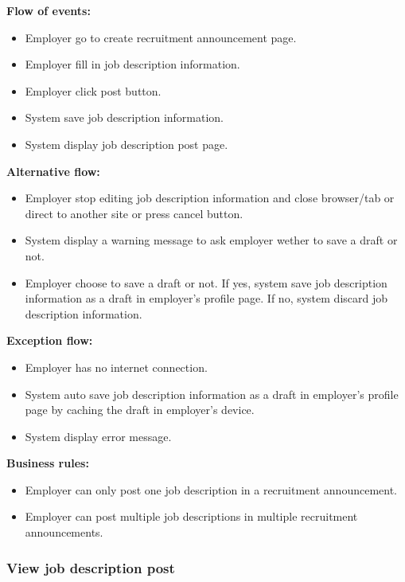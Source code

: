 \documentclass[a4paper]{article}
\begin{document}
        \textbf{Flow of events:}
        \begin{itemize}
            \item Employer go to create recruitment announcement page.
            \item Employer fill in job description information.
            \item Employer click post button.
            \item System save job description information.
            \item System display job description post page.
        \end{itemize}

        \textbf{Alternative flow:}
        \begin{itemize}
            \item Employer stop editing job description information and close browser/tab or direct to another site or press cancel button.
            \item System display a warning message to ask employer wether to save a draft or not.
            \item Employer choose to save a draft or not. If yes, system save job description information as a draft in employer's profile page. If no, system discard job description information.
        \end{itemize}

        \textbf{Exception flow:}
        \begin{itemize}
            \item Employer has no internet connection.
            \item System auto save job description information as a draft in employer's profile page by caching the draft in employer's device.
            \item System display error message.
        \end{itemize}

        \textbf{Business rules:}
        \begin{itemize}
            \item Employer can only post one job description in a recruitment announcement.
            \item Employer can post multiple job descriptions in multiple recruitment announcements.
        \end{itemize}

        \subsubsection{View job description post}
\end{document}
